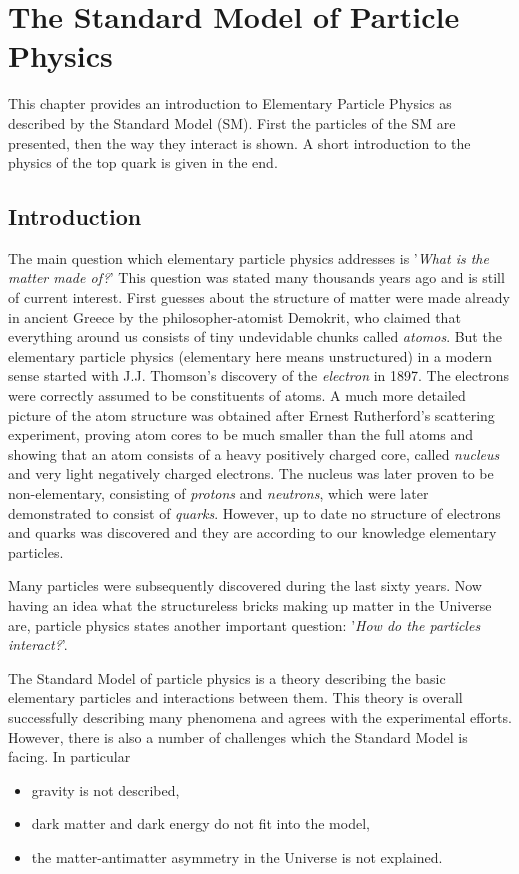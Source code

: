 \chapter{The Standard Model of Particle Physics}\label{chapt:SM}

This chapter provides an introduction to Elementary Particle Physics as described by the Standard Model (SM).
First the particles of the SM are presented, then the way they interact is shown. A short introduction
to the physics of the top quark is given in the end.

\section{Introduction}

The main question which elementary particle physics addresses is '\textit{What is the matter made of?}'
This question was stated many thousands years ago and is still of current interest. First guesses about
the structure of matter were made already in ancient Greece by the philosopher-atomist Demokrit, who
claimed that everything around us consists of tiny undevidable chunks called \textit{atomos}\cite{yangcn}.
But the elementary particle physics (elementary here means unstructured) in a modern sense started with 
J.J. Thomson's discovery of the \textit{electron}\cite{jjthome} in 1897. The electrons were correctly assumed to be constituents
of atoms. A much more detailed picture of the atom structure was obtained after Ernest Rutherford's scattering experiment\cite{rutherford},
proving atom cores to be much smaller than the full atoms and showing that an atom consists of a heavy positively charged core, called 
\textit{nucleus} and very light negatively charged electrons. 
The nucleus was later proven to be non-elementary, consisting of \textit{protons} and \textit{neutrons}, which were later demonstrated to
consist of \textit{quarks}. However, up to date no structure of electrons and quarks was discovered 
and they are according to our knowledge elementary particles. 

Many particles were subsequently discovered during the last sixty years. Now having an idea 
what the structureless bricks making up matter in the Universe are, particle physics
states another important question: '\textit{How do the particles interact?}'.

The Standard Model of particle physics is a theory describing the basic elementary particles
and interactions between them. This theory is overall successfully describing many phenomena and 
agrees with the experimental efforts. However, there is also a number of challenges which the Standard Model
is facing. In particular
\begin{itemize}
 \item gravity is not described,
 \item dark matter and dark energy do not fit into the model,
 \item the matter-antimatter asymmetry in the Universe is not explained.
\end{itemize}


